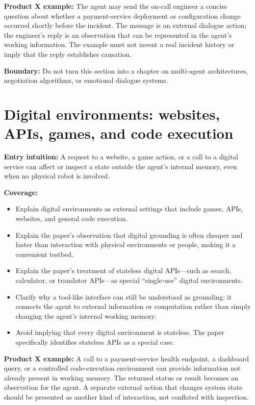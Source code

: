 \textbf{Product X example:} The agent may send the on-call engineer a concise question about whether a payment-service deployment or configuration change occurred shortly before the incident. The message is an external dialogue action; the engineer's reply is an observation that can be represented in the agent's working information. The example must not invent a real incident history or imply that the reply establishes causation.

\textbf{Boundary:} Do not turn this section into a chapter on multi-agent architectures, negotiation algorithms, or emotional dialogue systems. 

\section{Digital environments: websites, APIs, games, and code execution}
\textbf{Entry intuition:} A request to a website, a game action, or a call to a digital service can affect or inspect a state outside the agent's internal memory, even when no physical robot is involved.

\textbf{Coverage:}
\begin{itemize}
  \item Explain digital environments as external settings that include games, APIs, websites, and general code execution.
  \item Explain the paper's observation that digital grounding is often cheaper and faster than interaction with physical environments or people, making it a convenient testbed.
  \item Explain the paper's treatment of stateless digital APIs---such as search, calculator, or translator APIs---as special ``single-use'' digital environments.
  \item Clarify why a tool-like interface can still be understood as grounding: it connects the agent to external information or computation rather than simply changing the agent's internal working memory.
  \item Avoid implying that every digital environment is stateless. The paper specifically identifies stateless APIs as a special case.
\end{itemize}

\textbf{Product X example:} A call to a payment-service health endpoint, a dashboard query, or a controlled code-execution environment can provide information not already present in working memory. The returned status or result becomes an observation for the agent. A separate external action that changes system state should be presented as another kind of interaction, not conflated with inspection.

